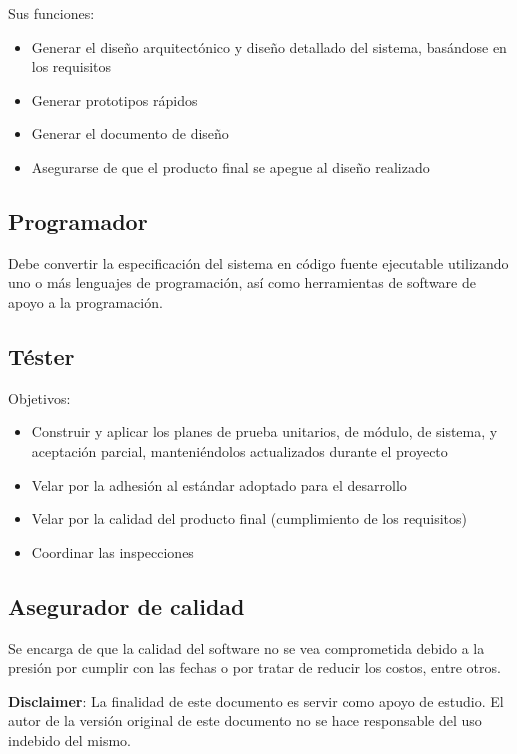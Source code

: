 \documentclass{article}
\begin{document}
\vspace{1em}
Sus funciones:

\begin{itemize}
	\item
		Generar el diseño arquitectónico y diseño detallado del sistema,
		basándose en los requisitos
	\item
		Generar prototipos rápidos
	\item
		Generar el documento de diseño
	\item
		Asegurarse de que el producto final se apegue al diseño realizado
\end{itemize}

\subsection{Programador}

Debe convertir la especificación del sistema en código fuente ejecutable
utilizando uno o más lenguajes de programación, así como herramientas de
software de apoyo a la programación.

\subsection{Téster}

Objetivos:

\begin{itemize}
	\item
		Construir y aplicar los planes de prueba unitarios, de módulo,
		de sistema, y aceptación parcial, manteniéndolos actualizados
		durante el proyecto
	\item
		Velar por la adhesión al estándar adoptado para el desarrollo
	\item
		Velar por la calidad del producto final (cumplimiento de los requisitos)
	\item
		Coordinar las inspecciones
\end{itemize}

\subsection{Asegurador de calidad}

Se encarga de que la calidad del software no se vea comprometida debido a la
presión por cumplir con las fechas o por tratar de reducir los costos, entre
otros.


\vspace{1em}
\textbf{Disclaimer}: La finalidad de este documento es servir como apoyo de estudio.
El autor de la versión original de este documento no se hace responsable del
uso indebido del mismo.
\end{document}
